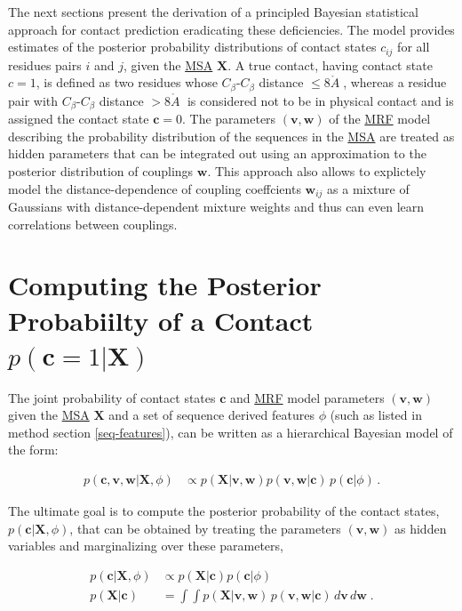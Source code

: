 \documentclass[11pt,a4paper,twoside]{book}
\newcommand{\Cb}{C_\beta}
\newcommand{\eq}{\!=\!}
\renewcommand{\c}{\mathbf{c}}
\newcommand{\cij}{c_{ij}}
\renewcommand{\v}{\mathbf{v}}
\newcommand{\w}{\mathbf{w}}
\newcommand{\wij}{\mathbf{w}_{ij}}
\newcommand{\X}{\mathbf{X}}
\newcommand{\angstrom}{\mathring{A} \;}
\theoremstyle{definition}
\theoremstyle{definition}
\theoremstyle{remark}
\begin{document}
The next sections present the derivation of a principled Bayesian
statistical approach for contact prediction eradicating these
deficiencies. The model provides estimates of the posterior probability
distributions of contact states \(\cij\) for all residues pairs \(i\)
and \(j\), given the \protect\hyperlink{abbrev}{MSA} \(\X\). A true
contact, having contact state \(c\eq1\), is defined as two residues
whose \(\Cb\)-\(\Cb\) distance \(\le 8 \angstrom\), whereas a residue
pair with \(\Cb\)-\(\Cb\) distance \(>8 \angstrom\) is considered not to
be in physical contact and is assigned the contact state \(\c\eq0\). The
parameters \((\v, \w)\) of the \protect\hyperlink{abbrev}{MRF} model
describing the probability distribution of the sequences in the
\protect\hyperlink{abbrev}{MSA} are treated as hidden parameters that
can be integrated out using an approximation to the posterior
distribution of couplings \(\w\). This approach also allows to
explictely model the distance-dependence of coupling coeffcients
\(\wij\) as a mixture of Gaussians with distance-dependent mixture
weights and thus can even learn correlations between couplings.

\section{\texorpdfstring{Computing the Posterior Probabiilty of a
Contact
\(p(\c \eq 1 | \X)\)}{Computing the Posterior Probabiilty of a Contact p(\textbackslash{}c \textbackslash{}eq 1 \textbar{} \textbackslash{}X)}}\label{overview-posterior-distances}

The joint probability of contact states \(\c\) and
\protect\hyperlink{abbrev}{MRF} model parameters \((\v, \w)\) given the
\protect\hyperlink{abbrev}{MSA} \(\X\) and a set of sequence derived
features \(\phi\) (such as listed in method section \ref{seq-features}),
can be written as a hierarchical Bayesian model of the form:

\begin{align}
        p(\c, \v, \w | \X, \phi) &\propto p(\X | \v, \w) p(\v, \w | \c) \, p(\c | \phi ) \, .
\label{eq:hierarchical-bayesian-model}
\end{align}

The ultimate goal is to compute the posterior probability of the contact
states, \(p(\c | \X, \phi)\), that can be obtained by treating the
parameters \((\v, \w)\) as hidden variables and marginalizing over these
parameters,

\begin{align}
    p(\c | \X , \phi) &\propto  p(\X | \c) p(\c | \phi)\\
    p(\X | \c) &= \int \int p(\X | \v,\w) \, p(\v, \w | \c) \,d\v\,d\w  \; .
\label{eq:integrate-out-vw}
\end{align}
\end{document}
